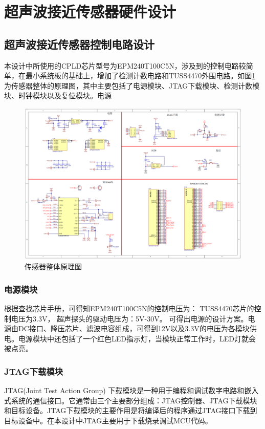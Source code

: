 \newpage
\section{超声波接近传感器硬件设计}

\subsection{超声波接近传感器控制电路设计}
本设计中所使用的CPLD芯片型号为EPM240T100C5N，涉及到的控制电路较简单，在最小系统板的基础上，增加了检测计数电路和TUSS4470外围电路。如图\ref{传感器整体原理图}为传感器整体的原理图，其中主要包括了电源模块、JTAG下载模块、检测计数模块、时钟模块以及复位模块。电源
\begin{figure}[ht]
	\centering
	\includegraphics[width=12cm]{figure/Overall circuit.png}
	\caption{传感器整体原理图}
	\label{传感器整体原理图}
\end{figure}
\subsubsection{电源模块}
根据查找芯片手册，可得知EPM240T100C5N的控制电压为：
TUSS4470芯片的控制电压为3.3V，
超声探头的驱动电压为：5V-30V。
可得出电源的设计方案。电源由DC接口、降压芯片、滤波电容组成，可得到12V以及3.3V的电压为各模块供电。电源模块中还包括了一个红色LED指示灯，当模块正常工作时，LED灯就会被点亮。

\subsubsection{JTAG下载模块}
JTAG(Joint Test Action Group) 下载模块是一种用于编程和调试数字电路和嵌入式系统的通信接口。它通常由三个主要部分组成：JTAG控制器、JTAG下载模块和目标设备。JTAG下载模块的主要作用是将编译后的程序通过JTAG接口下载到目标设备中。在本设计中JTAG主要用于下载烧录调试MCU代码。

